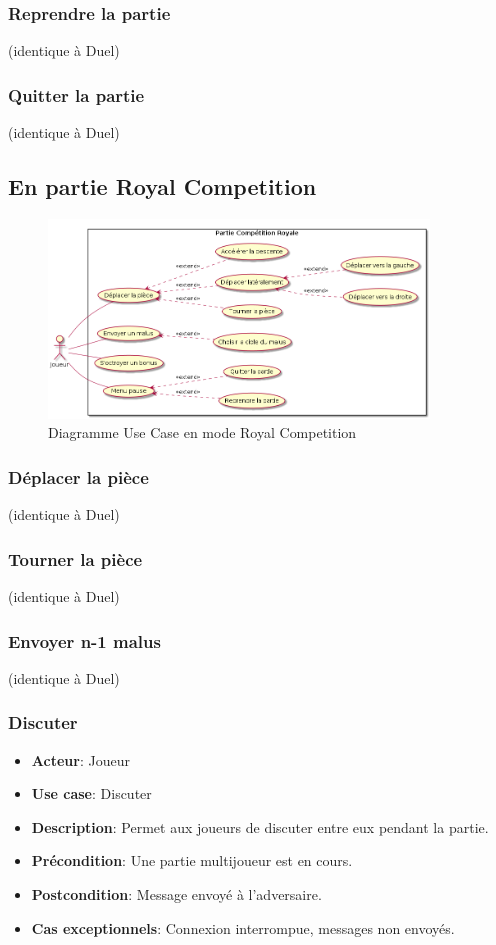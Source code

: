 \documentclass{article}
\begin{document}
\subsubsection*{Reprendre la partie} (identique à Duel)
\subsubsection*{Quitter la partie} (identique à Duel)

\subsection{En partie Royal Competition}

\begin{figure}
    \centering
    \includegraphics[width=0.9\textwidth]{./uml/usescase/en-jeu/royal-competition.png}
    \caption{Diagramme Use Case en mode Royal Competition}
    \label{fig:Royal-Competition}
\end{figure}

\subsubsection*{Déplacer la pièce} (identique à Duel)
\subsubsection*{Tourner la pièce} (identique à Duel)
\subsubsection*{Envoyer n-1 malus} (identique à Duel)

\subsubsection*{Discuter}
\begin{itemize}
    \item \textbf{Acteur}: Joueur
    \item \textbf{Use case}: Discuter
    \item \textbf{Description}: Permet aux joueurs de discuter entre eux pendant la partie.
    \item \textbf{Précondition}: Une partie multijoueur est en cours.
    \item \textbf{Postcondition}: Message envoyé à l'adversaire.
    \item \textbf{Cas exceptionnels}: Connexion interrompue, messages non envoyés.
\end{itemize}
\end{document}
